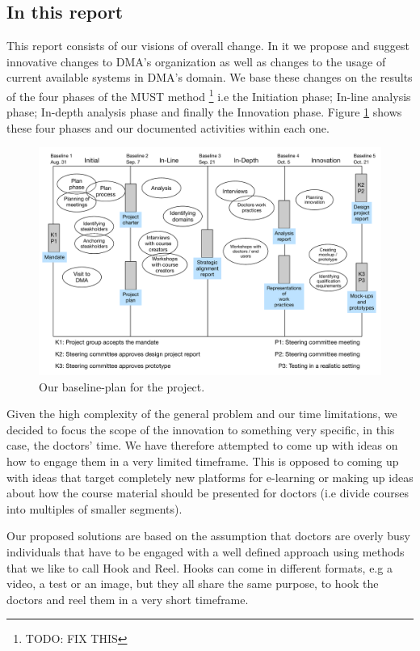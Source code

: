 \subsection{In this report}
This report consists of our visions of overall change. In it we propose and suggest innovative changes to DMA’s organization as well as changes to the usage of current available systems in DMA’s domain. We base these changes on the results of the four phases of the MUST method \cite{bodker}\footnote{TODO: FIX THIS} i.e the Initiation phase; In-line analysis phase; In-depth analysis phase and finally the Innovation phase. Figure \ref{fig:baseline_plan} shows these four phases and our documented activities within each one.

\begin{figure}[h!]
 \begin{center}
  \includegraphics[width=1\textwidth]{figures/baseline-plan.pdf}
  \caption{Our baseline-plan for the project.\label{fig:baseline_plan}}
 \end{center}
\end{figure}



Given the high complexity of the general problem and our time limitations, we decided to focus the scope of the innovation to something very specific, in this case, the doctors’ time. We have therefore attempted to come up with ideas on how to engage them in a very limited timeframe. This is opposed to coming up with ideas that target completely new platforms for e-learning or making up ideas about how the course material should be presented for doctors (i.e divide courses into multiples of smaller segments).

Our proposed solutions are based on the assumption that doctors are overly busy individuals that have to be engaged with a well defined approach using methods that we like to call Hook and Reel. Hooks can come in different formats, e.g a video, a test or an image, but they all share the same purpose, to hook the doctors and reel them in a very short timeframe.

